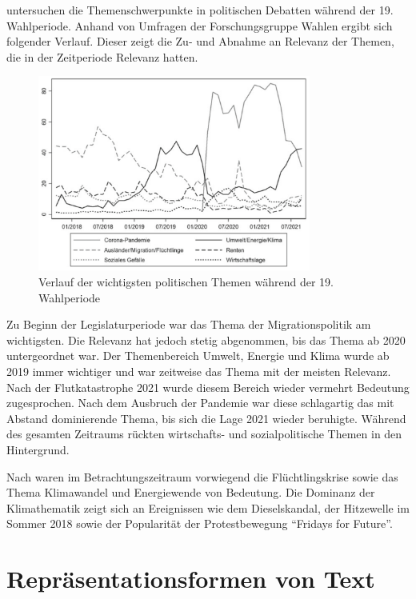 \textcite{engler_wettbewerb_2022} untersuchen die Themenschwerpunkte in politischen Debatten während der \num{19}. Wahlperiode. Anhand von Umfragen der Forschungsgruppe Wahlen ergibt sich folgender Verlauf. Dieser zeigt die Zu- und Abnahme an Relevanz der Themen, die in der Zeitperiode Relevanz hatten.

\begin{figure}[H]
    \centering
    \includegraphics[width=0.8\textwidth]{data/images/themenkonjunktur.png}
    \caption{Verlauf der wichtigsten politischen Themen während der 19. Wahlperiode \autocite{engler_wettbewerb_2022, forschungsgruppe_wahlen_forschungsgruppe_nodate}} \label{fig:themenkonjunktur}
\end{figure}

Zu Beginn der Legislaturperiode war das Thema der Migrationspolitik am wichtigsten. Die Relevanz hat jedoch stetig abgenommen, bis das Thema ab \num{2020} untergeordnet war. Der Themenbereich Umwelt, Energie und Klima wurde ab \num{2019} immer wichtiger und war zeitweise das Thema mit der meisten Relevanz. Nach der Flutkatastrophe \num{2021} wurde diesem Bereich wieder vermehrt Bedeutung zugesprochen. Nach dem Ausbruch der Pandemie war diese schlagartig das mit Abstand dominierende Thema, bis sich die Lage \num{2021} wieder beruhigte. Während des gesamten Zeitraums rückten wirtschafts- und sozialpolitische Themen in den Hintergrund.

Nach \textcite{niedermayer_entwicklung_2020} waren im Betrachtungszeitraum vorwiegend die Flüchtlingskrise sowie das Thema Klimawandel und Energiewende von Bedeutung. Die Dominanz der Klimathematik zeigt sich an Ereignissen wie dem Dieselskandal, der Hitzewelle im Sommer \num{2018} sowie der Popularität der Protestbewegung \enquote{Fridays for Future}.

\section{Repräsentationsformen von Text} \label{sec:representationForms}

